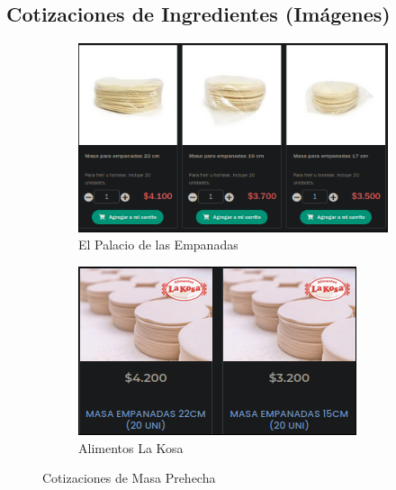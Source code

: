 \documentclass[12pt]{article}
\begin{document}
\subsection{Cotizaciones de Ingredientes (Imágenes)}
    \begin{figure}[H]
        \centering
        \begin{subfigure}{0.48\textwidth}
            \centering
            \includegraphics[width=\linewidth]{palaci}
            \caption{El Palacio de las Empanadas}
            \label{fig:palacio}
        \end{subfigure}
        \hfill
        \begin{subfigure}{0.48\textwidth}
            \centering
            \includegraphics[width=\linewidth]{kosa}
            \caption{Alimentos La Kosa}
            \label{fig:kosa}
        \end{subfigure}
        \caption{Cotizaciones de Masa Prehecha}
        \label{fig:cotizaciones_masas}
    \end{figure}
\end{document}
